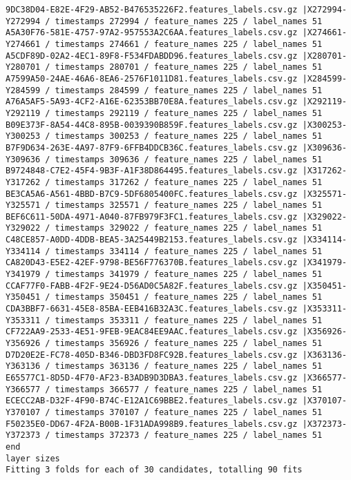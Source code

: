 \documentclass{UoNMCHA}
\numberwithin{equation}{section}
\begin{document}
\begin{lstlisting}
9DC38D04-E82E-4F29-AB52-B476535226F2.features_labels.csv.gz |X272994-Y272994 / timestamps 272994 / feature_names 225 / label_names 51
A5A30F76-581E-4757-97A2-957553A2C6AA.features_labels.csv.gz |X274661-Y274661 / timestamps 274661 / feature_names 225 / label_names 51
A5CDF89D-02A2-4EC1-89F8-F534FDABDD96.features_labels.csv.gz |X280701-Y280701 / timestamps 280701 / feature_names 225 / label_names 51
A7599A50-24AE-46A6-8EA6-2576F1011D81.features_labels.csv.gz |X284599-Y284599 / timestamps 284599 / feature_names 225 / label_names 51
A76A5AF5-5A93-4CF2-A16E-62353BB70E8A.features_labels.csv.gz |X292119-Y292119 / timestamps 292119 / feature_names 225 / label_names 51
B09E373F-8A54-44C8-895B-0039390B859F.features_labels.csv.gz |X300253-Y300253 / timestamps 300253 / feature_names 225 / label_names 51
B7F9D634-263E-4A97-87F9-6FFB4DDCB36C.features_labels.csv.gz |X309636-Y309636 / timestamps 309636 / feature_names 225 / label_names 51
B9724848-C7E2-45F4-9B3F-A1F38D864495.features_labels.csv.gz |X317262-Y317262 / timestamps 317262 / feature_names 225 / label_names 51
BE3CA5A6-A561-4BBD-B7C9-5DF6805400FC.features_labels.csv.gz |X325571-Y325571 / timestamps 325571 / feature_names 225 / label_names 51
BEF6C611-50DA-4971-A040-87FB979F3FC1.features_labels.csv.gz |X329022-Y329022 / timestamps 329022 / feature_names 225 / label_names 51
C48CE857-A0DD-4DDB-BEA5-3A25449B2153.features_labels.csv.gz |X334114-Y334114 / timestamps 334114 / feature_names 225 / label_names 51
CA820D43-E5E2-42EF-9798-BE56F776370B.features_labels.csv.gz |X341979-Y341979 / timestamps 341979 / feature_names 225 / label_names 51
CCAF77F0-FABB-4F2F-9E24-D56AD0C5A82F.features_labels.csv.gz |X350451-Y350451 / timestamps 350451 / feature_names 225 / label_names 51
CDA3BBF7-6631-45E8-85BA-EEB416B32A3C.features_labels.csv.gz |X353311-Y353311 / timestamps 353311 / feature_names 225 / label_names 51
CF722AA9-2533-4E51-9FEB-9EAC84EE9AAC.features_labels.csv.gz |X356926-Y356926 / timestamps 356926 / feature_names 225 / label_names 51
D7D20E2E-FC78-405D-B346-DBD3FD8FC92B.features_labels.csv.gz |X363136-Y363136 / timestamps 363136 / feature_names 225 / label_names 51
E65577C1-8D5D-4F70-AF23-B3ADB9D3DBA3.features_labels.csv.gz |X366577-Y366577 / timestamps 366577 / feature_names 225 / label_names 51
ECECC2AB-D32F-4F90-B74C-E12A1C69BBE2.features_labels.csv.gz |X370107-Y370107 / timestamps 370107 / feature_names 225 / label_names 51
F50235E0-DD67-4F2A-B00B-1F31ADA998B9.features_labels.csv.gz |X372373-Y372373 / timestamps 372373 / feature_names 225 / label_names 51
end
layer sizes
Fitting 3 folds for each of 30 candidates, totalling 90 fits

\end{lstlisting}
\end{document}
